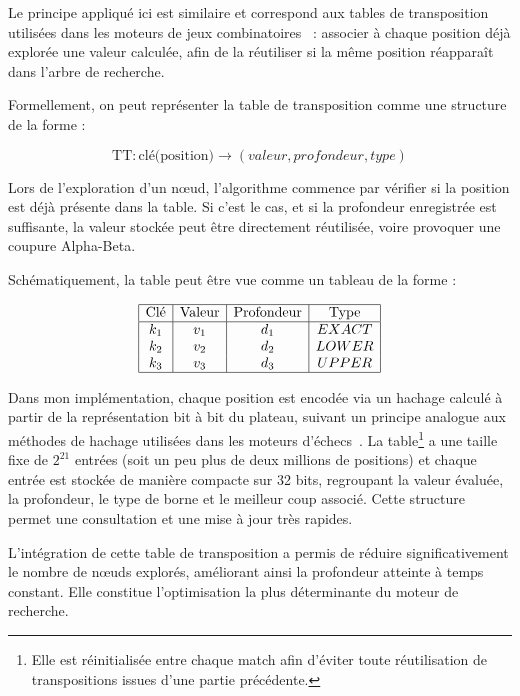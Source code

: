 \documentclass[11pt,a4paper]{article}
\begin{document}
Le principe appliqué ici est similaire et correspond aux tables de transposition utilisées dans les moteurs de jeux combinatoires~\cite{ChessProgrammingTT} : associer
à chaque position déjà explorée une valeur calculée, afin de la
réutiliser si la même position réapparaît dans l'arbre de recherche.

Formellement, on peut représenter la table de transposition comme une structure de la forme :

\[
\text{TT} : \text{clé(position)} \longrightarrow (valeur, profondeur, type)
\]

Lors de l'exploration d'un nœud, l'algorithme commence par vérifier si la position est déjà présente dans la table. Si c'est le cas,
et si la profondeur enregistrée est suffisante, la valeur stockée peut être directement réutilisée, voire provoquer une coupure
Alpha-Beta.

Schématiquement, la table peut être vue comme un tableau de la forme :

\begin{table}[h]
\centering
\[
\begin{array}{|c|c|c|c|}
\hline
\text{Clé} & \text{Valeur} & \text{Profondeur} & \text{Type} \\
\hline
k_1 & v_1 & d_1 & EXACT \\
k_2 & v_2 & d_2 & LOWER \\
k_3 & v_3 & d_3 & UPPER \\
\hline
\end{array}
\]
\caption{Structure d'une entrée de la table de transposition}
\label{tab:tt_structure}
\end{table}

Dans mon implémentation, chaque position est encodée via un hachage calculé à partir de la représentation bit à bit du plateau,
suivant un principe analogue aux méthodes de hachage utilisées dans les moteurs d'échecs~\cite{Zobrist1970,ChessProgrammingZobrist}. La
table\footnote{Elle est réinitialisée entre chaque match afin d’éviter toute réutilisation de transpositions issues d’une partie précédente.} a une taille fixe de $2^{21}$ entrées (soit un peu plus de deux millions de positions) et chaque entrée est stockée de
manière compacte sur 32 bits, regroupant la valeur évaluée, la profondeur, le type de borne et le meilleur coup associé. Cette
structure permet une consultation et une mise à jour très rapides.

L'intégration de cette table de transposition a permis de réduire significativement le nombre de nœuds explorés, améliorant ainsi
la profondeur atteinte à temps constant. Elle constitue l'optimisation la plus déterminante du moteur de recherche.
\end{document}

